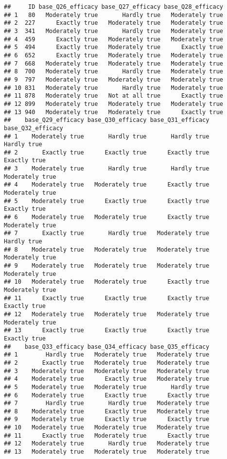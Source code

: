 \documentclass[]{article}
\begin{document}
\begin{verbatim}
##     ID base_Q26_efficacy base_Q27_efficacy base_Q28_efficacy
## 1   80   Moderately true       Hardly true   Moderately true
## 2  227      Exactly true   Moderately true   Moderately true
## 3  341   Moderately true       Hardly true   Moderately true
## 4  459      Exactly true   Moderately true   Moderately true
## 5  494      Exactly true   Moderately true      Exactly true
## 6  652      Exactly true   Moderately true   Moderately true
## 7  668   Moderately true   Moderately true   Moderately true
## 8  700   Moderately true       Hardly true   Moderately true
## 9  797   Moderately true   Moderately true   Moderately true
## 10 831   Moderately true       Hardly true   Moderately true
## 11 878   Moderately true   Not at all true      Exactly true
## 12 899   Moderately true   Moderately true   Moderately true
## 13 940   Moderately true   Moderately true      Exactly true
##    base_Q29_efficacy base_Q30_efficacy base_Q31_efficacy base_Q32_efficacy
## 1    Moderately true       Hardly true       Hardly true       Hardly true
## 2       Exactly true      Exactly true      Exactly true      Exactly true
## 3    Moderately true       Hardly true       Hardly true   Moderately true
## 4    Moderately true   Moderately true      Exactly true   Moderately true
## 5    Moderately true      Exactly true      Exactly true      Exactly true
## 6    Moderately true   Moderately true      Exactly true   Moderately true
## 7       Exactly true       Hardly true   Moderately true       Hardly true
## 8    Moderately true   Moderately true   Moderately true   Moderately true
## 9    Moderately true   Moderately true   Moderately true   Moderately true
## 10   Moderately true   Moderately true      Exactly true   Moderately true
## 11      Exactly true      Exactly true      Exactly true      Exactly true
## 12   Moderately true   Moderately true   Moderately true   Moderately true
## 13      Exactly true      Exactly true      Exactly true      Exactly true
##    base_Q33_efficacy base_Q34_efficacy base_Q35_efficacy
## 1        Hardly true   Moderately true   Moderately true
## 2       Exactly true   Moderately true   Moderately true
## 3    Moderately true   Moderately true   Moderately true
## 4    Moderately true      Exactly true   Moderately true
## 5    Moderately true   Moderately true       Hardly true
## 6    Moderately true      Exactly true      Exactly true
## 7        Hardly true       Hardly true   Moderately true
## 8    Moderately true      Exactly true   Moderately true
## 9    Moderately true      Exactly true      Exactly true
## 10   Moderately true   Moderately true   Moderately true
## 11      Exactly true   Moderately true      Exactly true
## 12   Moderately true       Hardly true   Moderately true
## 13   Moderately true   Moderately true   Moderately true
\end{verbatim}
\end{document}
